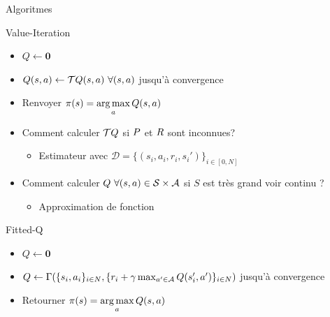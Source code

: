 \documentclass[french]{beamer}
\begin{document}
    \begin{frame}{Algoritmes}

        \begin{block}{Value-Iteration}
            \begin{itemize}
                \item $Q \leftarrow \mathbf{0}$
                \item $Q(s,a) \leftarrow \mathcal{T} Q(s,a)\ \forall (s,a)$ jusqu'à convergence
                \item Renvoyer $\pi(s) = \operatorname*{arg\,max}\limits_{a} Q(s,a)$
            \end{itemize}
        \end{block}
        \pause
        \begin{alertblock}{}
            \begin{itemize}
                \item Comment calculer $\mathcal{T} Q$ si $P$ et $R$ sont inconnues?
                \begin{itemize}
                    \item Estimateur avec $\mathcal{D}=\{(s_i,a_i,r_i,s_i')\}_{i\in[0,N]}$
                \end{itemize}
                \item Comment calculer $Q\ \forall (s,a) \in \mathcal{S}\times\mathcal{A}$ si $S$ est très grand voir continu ?
                \begin{itemize}
                    \item Approximation de fonction
                \end{itemize}
            \end{itemize}

        \end{alertblock}
        \pause
        \begin{block}{Fitted-Q}
            \begin{itemize}
                \item $Q \leftarrow \mathbf{0}$
                \item $Q \leftarrow \Gamma(\{s_{i},a_{i}\}_{{i}\in N},\{r_{i} + \gamma  \max_{a'\in\mathcal{A}} Q(s'_i,a')\}_{{i} \in N})$ jusqu'à convergence
                \item Retourner $\pi(s) = \operatorname*{arg\,max}\limits_{a} Q(s,a)$
            \end{itemize}
        \end{block}


    \end{frame}
\end{document}

